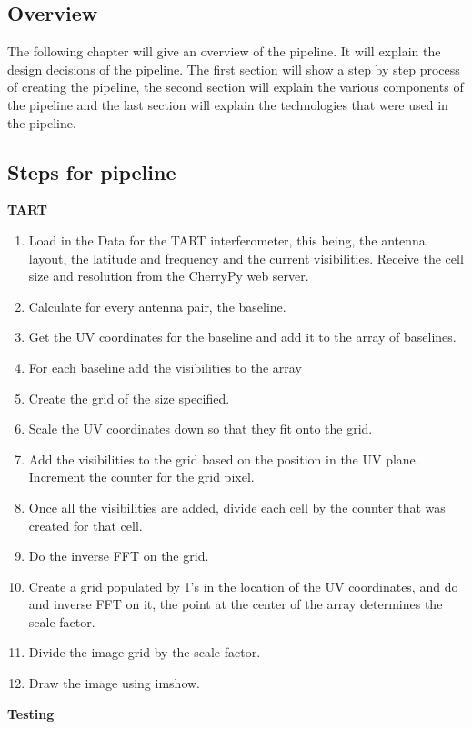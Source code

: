 \subsection{Overview}
The following chapter will give an overview of the pipeline. It will explain the design decisions of the pipeline. The first section will show a step by step process of creating the pipeline, the second section will explain the various components of the pipeline and the last section will explain the technologies that were used in the pipeline.
\subsection{Steps for pipeline}
\textbf{TART}
\begin{enumerate}
    \item Load in the Data for the TART interferometer, this being, the antenna layout, the latitude and frequency and the current visibilities. Receive the cell size and resolution from the CherryPy web server.
    \item Calculate for every antenna pair, the baseline.
    \item Get the UV coordinates for the baseline and add it to the array of baselines.
    \item For each baseline add the visibilities to the array
    \item Create the grid of the size specified.
    \item Scale the UV coordinates down so that they fit onto the grid.
    \item Add the visibilities to the grid based on the position in the UV plane. Increment the counter for the grid pixel.
    \item Once all the visibilities are added, divide each cell by the counter that was created for that cell.
    \item Do the inverse FFT on the grid.
    \item Create a grid populated by 1's in the location of the UV coordinates, and do and inverse FFT on it, the point at the center of the array determines the scale factor. 
    \item Divide the image grid by the scale factor.
    \item Draw the image using imshow.
\end{enumerate}
\textbf{Testing}
